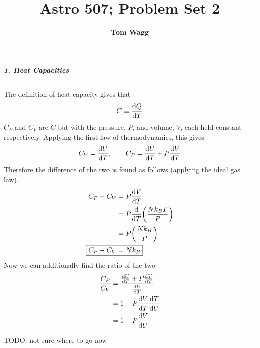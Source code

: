 \documentclass[12pt, letterpaper, twoside]{article}
\title{Astro 507; Problem Set 2}
\author{\textbf{Tom Wagg}}
\newcommand{\question}[1]{{\noindent \it #1}}
\newcommand{\answer}[1]{
    \par\noindent\rule{\textwidth}{0.4pt}#1\vspace{0.5cm}
}
\newcommand{\todo}[1]{{\color{red}\begin{center}TODO: #1\end{center}}}
\begin{document}
\maketitle

\question{\textbf{1. Heat Capacities}}
\answer{
    The definition of heat capacity gives that
    \begin{equation}
        C \equiv \dv{Q}{T}
    \end{equation}
    $C_P$ and $C_V$ are $C$ but with the pressure, $P$, and volume, $V$, each held constant respectively. Applying the first law of thermodynamics, this gives
    \begin{equation}
        C_V = \dv{U}{T},\qquad C_P = \dv{U}{T} + P \dv{V}{T}
    \end{equation}
    Therefore the difference of the two is found as follows (applying the ideal gas law).
    \begin{align}
        C_P - C_V &= P \dv{V}{T} \\
                  &= P \dv{T} \qty(\frac{N k_B T}{P}) \\
                  &= P \qty(\frac{N k_B}{P}) \\
        \Aboxed{ C_P - C_V &= N k_B }
    \end{align}
    Now we can additionally find the ratio of the two
    \begin{align}
        \frac{C_P}{C_V} &= \frac{\dv{U}{T} + P \dv{V}{T}}{\dv{U}{T}} \\
                        &= 1 + P \dv{V}{T} \dv{T}{U} \\
                        &= 1 + P \dv{V}{U}
    \end{align}
    \todo{not sure where to go now}
}

\pagebreak
\end{document}
